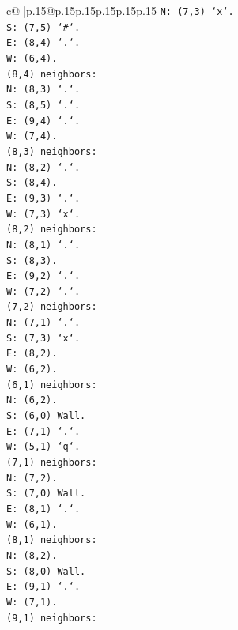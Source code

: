 \documentclass{article}
\begin{document}
{\begin{supertabular}{c@{$\;$}|p{.15\linewidth}@{}p{.15\linewidth}p{.15\linewidth}p{.15\linewidth}p{.15\linewidth}p{.15\linewidth}}
{{{\texttt{N: (7,3) `x`.} \\
\texttt{S: (7,5) `\#`.} \\
\texttt{E: (8,4) `.`.} \\
\texttt{W: (6,4).} \\
\texttt{(8,4) neighbors:} \\
\texttt{N: (8,3) `.`.} \\
\texttt{S: (8,5) `.`.} \\
\texttt{E: (9,4) `.`.} \\
\texttt{W: (7,4).} \\
\texttt{(8,3) neighbors:} \\
\texttt{N: (8,2) `.`.} \\
\texttt{S: (8,4).} \\
\texttt{E: (9,3) `.`.} \\
\texttt{W: (7,3) `x`.} \\
\texttt{(8,2) neighbors:} \\
\texttt{N: (8,1) `.`.} \\
\texttt{S: (8,3).} \\
\texttt{E: (9,2) `.`.} \\
\texttt{W: (7,2) `.`.} \\
\texttt{(7,2) neighbors:} \\
\texttt{N: (7,1) `.`.} \\
\texttt{S: (7,3) `x`.} \\
\texttt{E: (8,2).} \\
\texttt{W: (6,2).} \\
\texttt{(6,1) neighbors:} \\
\texttt{N: (6,2).} \\
\texttt{S: (6,0) Wall.} \\
\texttt{E: (7,1) `.`.} \\
\texttt{W: (5,1) `q`.} \\
\texttt{(7,1) neighbors:} \\
\texttt{N: (7,2).} \\
\texttt{S: (7,0) Wall.} \\
\texttt{E: (8,1) `.`.} \\
\texttt{W: (6,1).} \\
\texttt{(8,1) neighbors:} \\
\texttt{N: (8,2).} \\
\texttt{S: (8,0) Wall.} \\
\texttt{E: (9,1) `.`.} \\
\texttt{W: (7,1).} \\
\texttt{(9,1) neighbors:} \\
}}}
\end{supertabular}}
\end{document}

